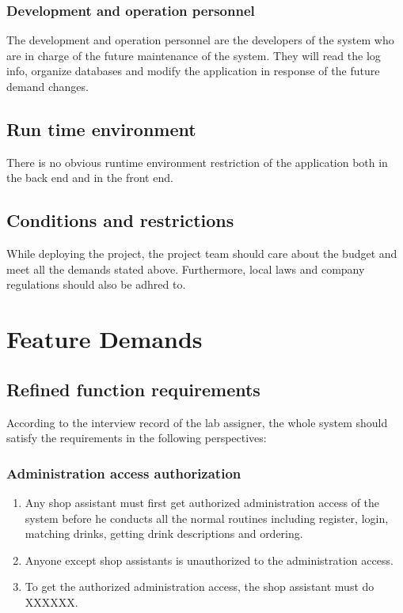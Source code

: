 \documentclass[a4paper]{report}
\begin{document}
\subsection{Development and operation personnel}
The development and operation personnel are the developers of the system who are in charge of the future maintenance of the system. They will read the log info, organize databases and modify the application in response of the future demand changes.
\section{Run time environment}
There is no obvious runtime environment restriction of the application both in the back end and in the front end.
\section{Conditions and restrictions}
While deploying the project, the project team should care about the budget and meet all the demands stated above. Furthermore, local laws and company regulations should also be adhred to.
\chapter{Feature Demands}

\section{Refined function requirements}
According to the interview record of the lab assigner, the whole system should satisfy the requirements in the following perspectives:
\subsection{Administration access authorization}
\begin{enumerate}
\item Any shop assistant must first get authorized administration access of the system before he conducts all the normal routines including register, login, matching drinks, getting drink descriptions and ordering. 
\item Anyone except shop assistants is unauthorized to the administration access.
\item To get the authorized administration access, the shop assistant must do XXXXXX.
\end{enumerate}
\end{document}
